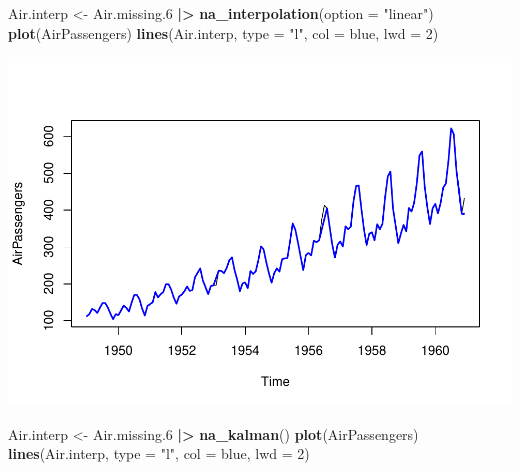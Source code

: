 \documentclass[
]{report}
\newenvironment{Shaded}{\begin{snugshade}}{\end{snugshade}}
\newcommand{\AttributeTok}[1]{\textcolor[rgb]{0.13,0.29,0.53}{#1}}
\newcommand{\DecValTok}[1]{\textcolor[rgb]{0.00,0.00,0.81}{#1}}
\newcommand{\FloatTok}[1]{\textcolor[rgb]{0.00,0.00,0.81}{#1}}
\newcommand{\FunctionTok}[1]{\textcolor[rgb]{0.13,0.29,0.53}{\textbf{#1}}}
\newcommand{\NormalTok}[1]{#1}
\newcommand{\OtherTok}[1]{\textcolor[rgb]{0.56,0.35,0.01}{#1}}
\newcommand{\SpecialCharTok}[1]{\textcolor[rgb]{0.81,0.36,0.00}{\textbf{#1}}}
\newcommand{\StringTok}[1]{\textcolor[rgb]{0.31,0.60,0.02}{#1}}
\begin{document}

\begin{Shaded}
\begin{Highlighting}[]
\NormalTok{Air.interp }\OtherTok{\textless{}{-}}\NormalTok{ Air.missing}\FloatTok{.6} \SpecialCharTok{|\textgreater{}} \FunctionTok{na\_interpolation}\NormalTok{(}\AttributeTok{option =} \StringTok{"linear"}\NormalTok{)}
\FunctionTok{plot}\NormalTok{(AirPassengers)}
\FunctionTok{lines}\NormalTok{(Air.interp, }\AttributeTok{type =} \StringTok{"l"}\NormalTok{, }\AttributeTok{col =} \StringTok{\textquotesingle{}blue\textquotesingle{}}\NormalTok{, }\AttributeTok{lwd =} \DecValTok{2}\NormalTok{)}
\end{Highlighting}
\end{Shaded}

\includegraphics{ProjectReport_files/figure-latex/unnamed-chunk-17-1.pdf}

\begin{Shaded}
\begin{Highlighting}[]
\NormalTok{Air.interp }\OtherTok{\textless{}{-}}\NormalTok{ Air.missing}\FloatTok{.6} \SpecialCharTok{|\textgreater{}} \FunctionTok{na\_kalman}\NormalTok{()}
\FunctionTok{plot}\NormalTok{(AirPassengers)}
\FunctionTok{lines}\NormalTok{(Air.interp, }\AttributeTok{type =} \StringTok{"l"}\NormalTok{, }\AttributeTok{col =} \StringTok{\textquotesingle{}blue\textquotesingle{}}\NormalTok{, }\AttributeTok{lwd =} \DecValTok{2}\NormalTok{)}
\end{Highlighting}
\end{Shaded}
\end{document}
